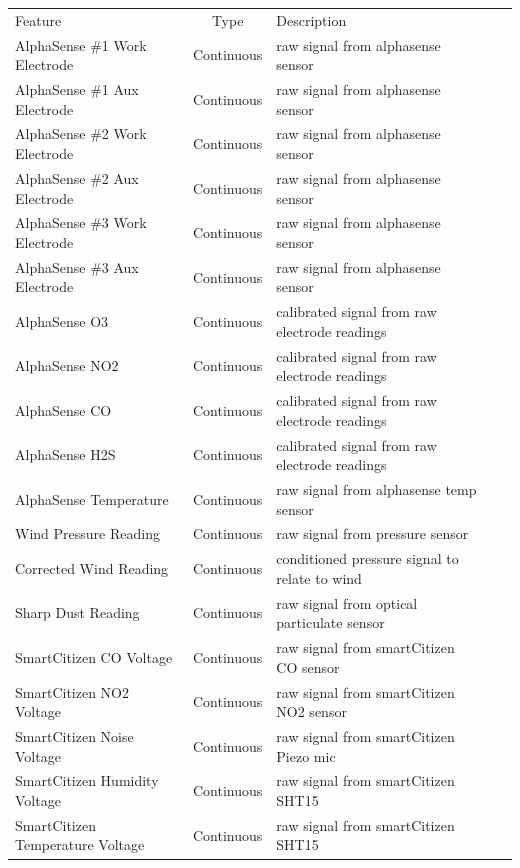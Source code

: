 \begin{table}[H]
\small
\centering
\begin{tabular}{lclc|c|}
\\
\\
\toprule
Feature & Type & Description \\
\midrule
AlphaSense \#1 Work Electrode & Continuous & raw signal from alphasense sensor \\
AlphaSense \#1 Aux Electrode & Continuous & raw signal from alphasense sensor \\
AlphaSense \#2 Work Electrode & Continuous & raw signal from alphasense sensor \\
AlphaSense \#2 Aux Electrode & Continuous & raw signal from alphasense sensor \\
AlphaSense \#3 Work Electrode & Continuous & raw signal from alphasense sensor \\
AlphaSense \#3 Aux Electrode & Continuous & raw signal from alphasense sensor \\
AlphaSense O3 & Continuous & calibrated signal from raw electrode readings \\
AlphaSense NO2 & Continuous & calibrated signal from raw electrode readings \\
AlphaSense CO & Continuous & calibrated signal from raw electrode readings \\
AlphaSense H2S & Continuous & calibrated signal from raw electrode readings \\
AlphaSense Temperature & Continuous & raw signal from alphasense temp sensor \\
Wind Pressure Reading & Continuous & raw signal from pressure sensor \\
Corrected Wind Reading & Continuous & conditioned pressure signal to relate to wind \\
Sharp Dust Reading & Continuous & raw signal from optical particulate sensor \\
SmartCitizen CO Voltage & Continuous & raw signal from smartCitizen CO sensor \\
SmartCitizen NO2 Voltage & Continuous & raw signal from smartCitizen NO2 sensor \\
SmartCitizen Noise Voltage & Continuous & raw signal from smartCitizen Piezo mic \\
SmartCitizen Humidity Voltage & Continuous & raw signal from smartCitizen SHT15 \\
SmartCitizen Temperature Voltage & Continuous & raw signal from smartCitizen SHT15 \\

\end{tabular}
\end{table}
